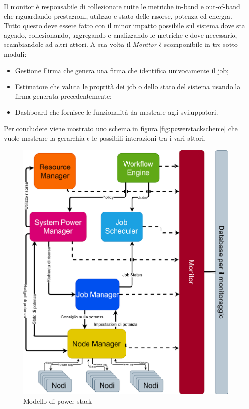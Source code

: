Il monitor è responsabile di collezionare tutte le metriche in-band e out-of-band che riguardando prestazioni, utilizzo e stato delle risorse, potenza ed energia.
Tutto questo deve essere fatto con il minor impatto possibile sul sistema dove sta agendo, collezionando, aggregando e analizzando le metriche e dove necessario, scambiandole ad altri attori. A sua volta il \emph{Monitor} è scomponibile in tre sotto-moduli:
\begin{itemize}
    \item Gestione Firma che genera una firma che identifica univocamente il job; 
    \item Estimatore che valuta le proprità dei job o dello stato del sistema usando la firma generata precedentemente;
    \item Dashboard che fornisce le funzionalità da mostrare agli sviluppatori.
\end{itemize}


Per concludere viene mostrato uno schema in figura \ref{fig:powerstackscheme} che vuole mostrare la gerarchia e le possibili interazioni tra i vari attori.
\begin{figure}[H]
    \centering
    \includegraphics[width=\textwidth]{img/SchemaPowerStack.drawio.png}
    \caption{Modello di power stack} 
    \label{fig:minpowerstackscheme}
\end{figure}



